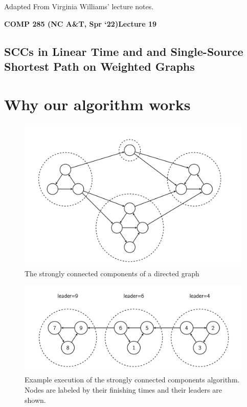 \documentclass [12pt]{article}
\theoremstyle{definition}
\begin{document}
 

\vspace {1em} 
\begin {Instruction} 
Adapted From Virginia Williams' lecture notes.
\end {Instruction}  

{\LARGE \textbf {COMP 285 (NC A\&T, Spr `22)}\hfill \textbf {Lecture 19} } 

\begin{centering}
\section*{SCCs in Linear Time and and Single-Source Shortest Path on Weighted Graphs}
\end{centering}


\section{Why our algorithm works}

\begin{figure}[ht!]
\centering
\includegraphics[scale=0.5]{scc_graph.png}
\caption{The strongly connected components of a directed graph}
\label{fig:scc_graph}
\end{figure}


\begin{figure}[ht!]
\includegraphics[scale=0.8]{scc_alg.png}
\caption{Example execution of the strongly connected components algorithm. Nodes are labeled by their finishing times and their leaders are shown.}
\label{fig:scc_alg}
\end{figure}
\end{document}
